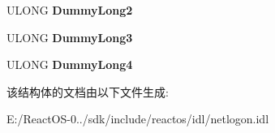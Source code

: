 \begin{DoxyCompactItemize}
U\+L\+O\+NG {\bfseries Dummy\+Long2}
\item 
\mbox{\label{struct___n_e_t_l_o_g_o_n___d_e_l_t_a___s_e_c_r_e_t_a2b449763903a022e0ba744038891e113}} 
U\+L\+O\+NG {\bfseries Dummy\+Long3}
\item 
\mbox{\label{struct___n_e_t_l_o_g_o_n___d_e_l_t_a___s_e_c_r_e_t_ad8c17a0942c0ef3a45e82f89ab17b0c2}} 
U\+L\+O\+NG {\bfseries Dummy\+Long4}
\end{DoxyCompactItemize}


该结构体的文档由以下文件生成\+:\begin{DoxyCompactItemize}
\item 
E\+:/\+React\+O\+S-\/0../sdk/include/reactos/idl/netlogon.\+idl\end{DoxyCompactItemize}
